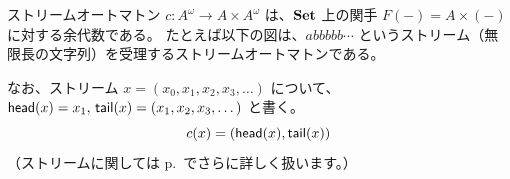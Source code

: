 \documentclass[
		head_space=20mm,
		foot_space=20mm,
		gutter=10mm,
		line_length=190mm
]{jlreq}
\begin{document}


\clearpage

\begin{example}
	ストリームオートマトン $c:A^\omega\to A\times A^\omega$ は、$\mathbf{Set}$ 上の関手 $F(-)=A\times (-)$ に対する余代数である。
	たとえば以下の図は、$abbbbb\cdots$ というストリーム（無限長の文字列）を受理するストリームオートマトンである。\vspace{10pt}
	\begin{center}
	\end{center}
	なお、ストリーム $x=(x_0,x_1,x_2,x_3,\dots)$ について、$\mathsf{head}(x)=x_1,\,\mathsf{tail}(x)=(x_1,x_2,x_3,\dots)$ と書く。\[c(x)=(\mathsf{head}(x),\mathsf{tail}(x))\]
	（ストリームに関しては p.\,\pageref{page:list-and-stream} でさらに詳しく扱います。）
\end{example}
\end{document}
